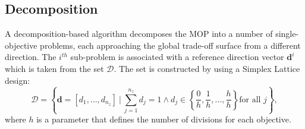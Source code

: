 \documentclass{llncs}
\newcommand{\vd}{\mathbf{d}} %
\newcommand{\DSet}{\mathcal{D}} %
\begin{document}

\subsection{Decomposition}\label{sec:decomposition}

A decomposition-based algorithm decomposes the MOP into a number of single-objective problems, each approaching the global trade-off surface from a different direction. The $i^{th}$ sub-problem is associated with a reference direction vector $\vd^i$ which is taken from the set $\DSet$. The set is constructed by using a Simplex Lattice design:
\begin{equation}
 \DSet = \left\{ \vd =[d_1,\ldots,d_{n_z}]~ |~ \sum_{j=1}^{n_z} d_j=1 \wedge   d_j\in \left\{\frac{0}{h},\frac{1}{h},\ldots,\frac{h}{h}\right\} \text{for all } j \right\},
 \label{eq:simplex_lattice_design}
\end{equation}
where $h$ is a parameter that defines the number of divisions for each objective.
\end{document}
